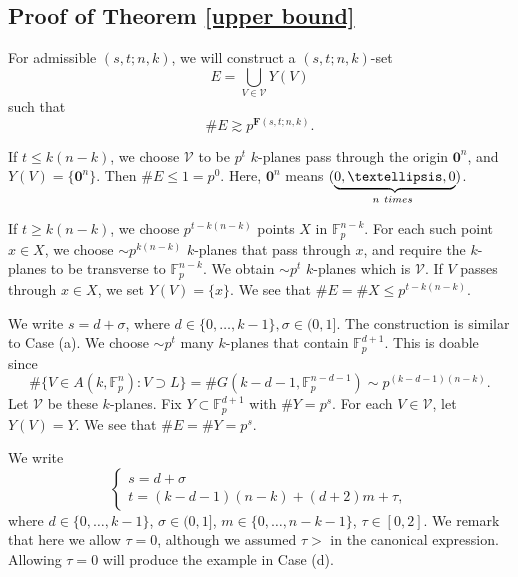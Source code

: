 \documentclass[10pt]{article}
\newcommand{\cV}{\mathcal{V}}
\newcommand{\bF}{\mathbf{F}}
\newcommand{\Fp}{\mathbb{F}_p}
\newcommand{\si}{\sigma}
\newcommand{\bzz}{\mathbf{0}}
\begin{document}
\subsection{Proof of Theorem \ref{upper bound}}\hfill

For admissible $(s,t;n,k)$, we will construct a $(s,t;n,k)$-set 
\[ E=\bigcup_{V\in\cV}Y(V) \]
such that
\[ \#E\gtrsim p^{\bF(s,t;n,k)}. \]


If $t\le k(n-k)$, we choose $\cV$ to be $p^t$ $k$-planes pass through the origin $\bzz^n$, and $Y(V)=\{\bzz^n\}$. Then $\#E\le 1=p^0$. Here, $\bzz^n$ means $(\underbrace{0,\dots,0}_{n \textup{~times~}})$.

If $t\ge k(n-k)$, we choose $p^{t-k(n-k)}$ points $X$ in $\Fp^{n-k}$. For each such point $x\in X$, we choose $\sim p^{k(n-k)}$ $k$-planes that pass through $x$, and require the $k$-planes to be transverse to $\Fp^{n-k}$. We obtain $\sim p^t$ $k$-planes which is $\cV$. If $V$ passes through $x\in X$, we set $Y(V)=\{x\}$. We see that $\#E=\#X\le p^{t-k(n-k)}$.

\bigskip


We write $s=d+\si$, where $d\in \{0,\dots,k-1\}, \si\in(0,1]$.
The construction is similar to Case (a). We choose $\sim p^t$ many $k$-planes that contain $\Fp^{d+1}$. This is doable since 
\[ \#\{ V\in A(k,\Fp^n): V\supset L \}=\#G(k-d-1,\Fp^{n-d-1})\sim p^{(k-d-1)(n-k)}. \]
Let $\cV$ be these $k$-planes. Fix $Y\subset \Fp^{d+1}$ with $\#Y=p^s$. For each $V\in \cV$, let $Y(V)=Y$. We see that $\#E=\#Y=p^s$.





\bigskip

\fbox{Case (c): $s\in (0,k], t\in ((k-d-1)(n-k),(k+1)(n-k)]$}

We write 
\begin{equation}\label{stformula}
    \begin{cases}
        s=d+\si\\
        t=(k-d-1)(n-k)+(d+2)m+\tau,
    \end{cases}
\end{equation} 
    where $d\in\{0,\dots,k-1\}$, $\si\in (0,1]$,  $m\in\{0,\dots,n-k-1\}$, $\tau\in [0,2]$. We remark that here we allow $\tau=0$, although we assumed $\tau>$ in the canonical expression. Allowing $\tau=0$ will produce the example in Case (d).
\end{document}
